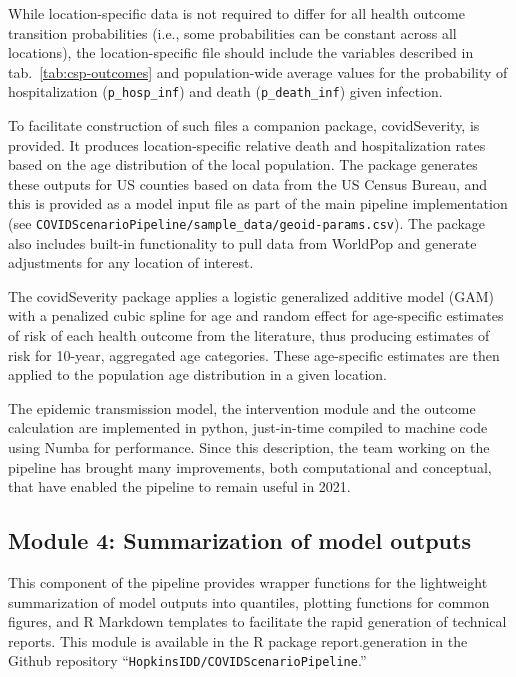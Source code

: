 {While location-specific data is not required to differ for all health outcome transition probabilities (i.e., some probabilities can be constant across all locations), the location-specific file should include the variables described in tab.~\ref{tab:csp-outcomes} and population-wide average values for the probability of hospitalization (\verb|p_hosp_inf|) and death (\verb|p_death_inf|) given infection.

To facilitate construction of such files a companion package, covidSeverity, is provided. It produces location-specific relative death and hospitalization rates based on the age distribution of the local population\cite{Lauer:HopkinsIDDCovidSeverityInitial:2020}. The package generates these outputs for US counties based on data from the US Census Bureau, and  this is provided as a model input file as part of the main pipeline implementation (see \verb|COVIDScenarioPipeline/sample_data/geoid-params.csv|). The package also includes built-in functionality to pull data from WorldPop and generate adjustments for any location of interest\cite{Lauer:HopkinsIDDCovidSeverityInitial:2020}.

The covidSeverity package applies a logistic generalized additive model (GAM) with a penalized cubic spline for age and random effect for age-specific estimates of risk of each health outcome from the literature, thus producing estimates of risk for 10-year, aggregated age categories. These age-specific estimates are then applied to the population age distribution in a given location.

The epidemic transmission model, the intervention module and the outcome calculation are implemented in python, just-in-time compiled to machine code using Numba\cite{Lam:NumbaLLVMbasedPython:2015} for performance. Since this description, the team working on the pipeline has brought many improvements, both computational and conceptual, that have enabled the pipeline to remain useful in 2021.

\subsection{Module 4: Summarization of model outputs}
This component of the pipeline provides wrapper functions for the lightweight summarization of model outputs into quantiles, plotting functions for common figures, and R Markdown templates to facilitate the rapid generation of technical reports. This module is available in the R package report.generation in the Github repository “\verb|HopkinsIDD/COVIDScenarioPipeline|.”

}
